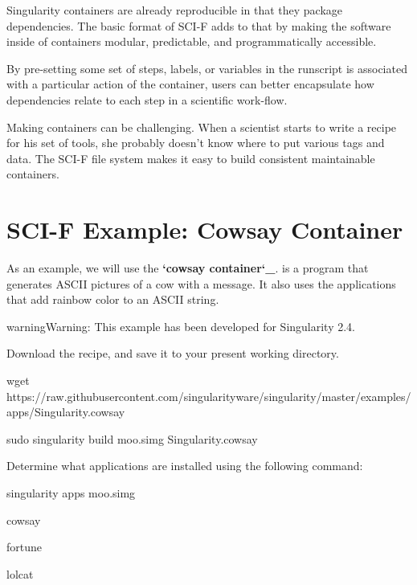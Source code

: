 \documentclass[letterpaper,10pt,english]{sphinxmanual}
\begin{document}
Singularity containers are already reproducible in that they package
dependencies. The basic format of SCI-F adds to that by making the software
inside of containers modular, predictable, and programmatically accessible.

By pre-setting some set of steps, labels, or variables in the
runscript is associated with a particular action of the container, users can better encapsulate how dependencies relate to each step in a scientific
work-flow.

Making containers can be challenging. When a scientist starts to
write a recipe for his set of tools, she probably doesn’t know where to
put various tags and data. The SCI-F file system makes it easy to build consistent maintainable containers.


\section{SCI-F Example: Cowsay Container}
\label{\detokenize{reproducible_scif_apps:sci-f-example-cowsay-container}}
As an example, we will use the {\color{red}\bfseries{}{}`cowsay container{}`\_}.  is a program that generates ASCII pictures of a cow with a message.
It also uses the  applications that add rainbow color to an ASCII string.

\begin{sphinxadmonition}{warning}{Warning:}
 This example has been developed for Singularity 2.4.
\end{sphinxadmonition}

Download the recipe, and save it to your
present working directory.

%
\begin{sphinxVerbatim}[commandchars=\\\{\}]
wget https://raw.githubusercontent.com/singularityware/singularity/master/examples/apps/Singularity.cowsay

sudo singularity build moo.simg Singularity.cowsay
\end{sphinxVerbatim}

Determine what applications are installed using the following command:

%
\begin{sphinxVerbatim}[commandchars=\\\{\}]
singularity apps moo.simg

cowsay

fortune

lolcat
\end{sphinxVerbatim}
\end{document}
